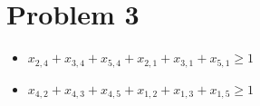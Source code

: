 \documentclass[11pt]{article}
\begin{document}
\section*{Problem 3}
\label{sec:orgd30e8f3}
\begin{itemize}
\item \(x_{2,4}+x_{3,4}+x_{5,4}+x_{2,1}+x_{3,1}+x_{5,1}\geq 1\)
\item \(x_{4,2}+x_{4,3}+x_{4,5}+x_{1,2}+x_{1,3}+x_{1,5}\geq 1\)
\end{itemize}
\end{document}
